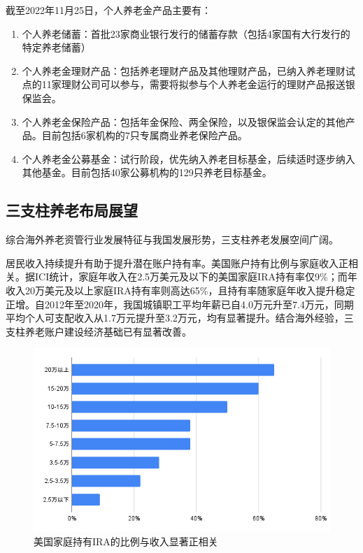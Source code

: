 \documentclass[a4paper,10.5pt]{ctexart}
\begin{document}
截至2022年11月25日，个人养老金产品主要有：
\begin{enumerate}
    \item 个人养老储蓄：首批23家商业银行发行的储蓄存款（包括4家国有大行发行的特定养老储蓄）
    \item 个人养老金理财产品：包括养老理财产品及其他理财产品，已纳入养老理财试点的11家理财公司可以参与，需要将拟参与个人养老金运行的理财产品报送银保监会。
    \item 个人养老金保险产品：包括年金保险、两全保险，以及银保监会认定的其他产品。目前包括6家机构的7只专属商业养老保险产品。
    \item 个人养老金公募基金：试行阶段，优先纳入养老目标基金，后续适时逐步纳入其他基金。目前包括40家公募机构的129只养老目标基金。
\end{enumerate}

\subsection{三支柱养老布局展望}
综合海外养老资管行业发展特征与我国发展形势，三支柱养老发展空间广阔。

居民收入持续提升有助于提升潜在账户持有率。美国账户持有比例与家庭收入正相关。据ICI统计，家庭年收入在2.5万美元及以下的美国家庭IRA持有率仅9\%；而年收入20万美元及以上家庭IRA持有率则高达65\%，且持有率随家庭年收入提升稳定正增。自2012年至2020年，我国城镇职工平均年薪已自4.0万元升至7.4万元，同期平均个人可支配收入从1.7万元提升至3.2万元，均有显著提升。结合海外经验，三支柱养老账户建设经济基础已有显著改善。
\begin{figure}[H]
    \includegraphics[width=\linewidth]{img/美国家庭持有IRA的比例与收入显著正相关.png}
    \caption{美国家庭持有IRA的比例与收入显著正相关}
\end{figure}
\end{document}
